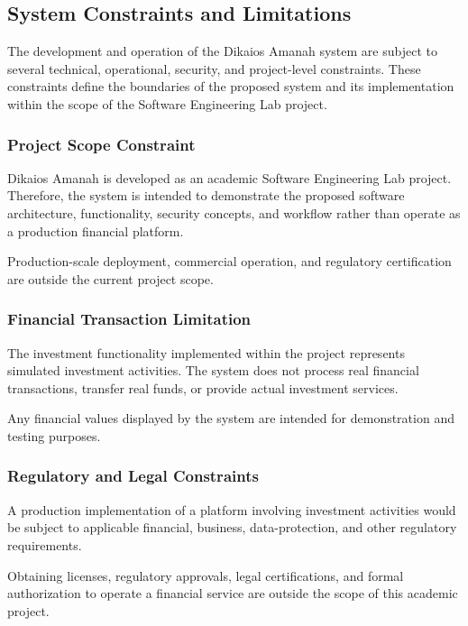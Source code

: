 \subsection{System Constraints and Limitations}

The development and operation of the Dikaios Amanah system are subject
to several technical, operational, security, and project-level
constraints. These constraints define the boundaries of the proposed
system and its implementation within the scope of the Software
Engineering Lab project.

\subsubsection{Project Scope Constraint}

Dikaios Amanah is developed as an academic Software Engineering Lab
project. Therefore, the system is intended to demonstrate the proposed
software architecture, functionality, security concepts, and workflow
rather than operate as a production financial platform.

Production-scale deployment, commercial operation, and regulatory
certification are outside the current project scope.

\subsubsection{Financial Transaction Limitation}

The investment functionality implemented within the project represents
simulated investment activities. The system does not process real
financial transactions, transfer real funds, or provide actual
investment services.

Any financial values displayed by the system are intended for
demonstration and testing purposes.

\subsubsection{Regulatory and Legal Constraints}

A production implementation of a platform involving investment
activities would be subject to applicable financial, business,
data-protection, and other regulatory requirements.

Obtaining licenses, regulatory approvals, legal certifications, and
formal authorization to operate a financial service are outside the
scope of this academic project.

